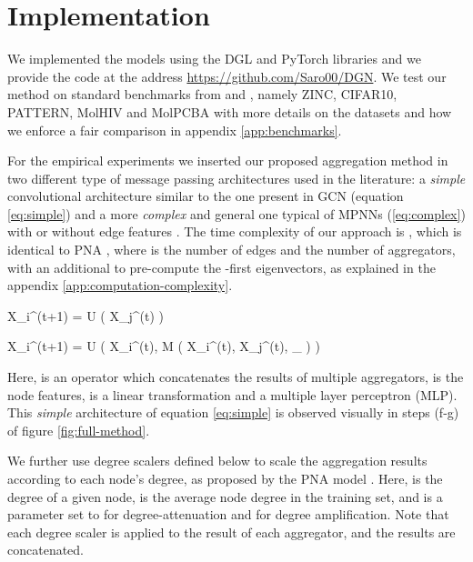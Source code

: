\documentclass{article} \usepackage{arxiv,times}
\begin{document}
\section{Implementation}
\label{sec:implementation}

We implemented the models using the DGL and PyTorch libraries and we provide the code at the address
\href{https://github.com/Saro00/DGN}{https://github.com/Saro00/DGN}. 
We test our method on standard benchmarks from \cite{dwivedi2020benchmarking} and \cite{hu2020open}, namely ZINC, CIFAR10, PATTERN, MolHIV and MolPCBA with more details on the datasets and how we enforce a fair comparison in appendix \ref{app:benchmarks}.

For the empirical experiments we inserted our proposed aggregation method in two different type of message passing architectures used in the literature: a \textit{simple} convolutional architecture similar to the one present in GCN (equation \ref{eq:simple}) \cite{kipf2016gcn} and a more \textit{complex} and general one typical of MPNNs (\ref{eq:complex}) \cite{gilmer2017mpnn} with or without edge features . The time complexity of our approach is , which is identical to PNA \cite{corso2020principal}, where  is the number of edges and  the number of aggregators, with an additional  to pre-compute the -first eigenvectors, as explained in the appendix \ref{app:computation-complexity}.

     \label{eq:simple}
    X_i^{(t+1)} = 
    U \Bigg(
    X_j^{(t)} \Bigg)
  
    \label{eq:complex}
    X_i^{(t+1)} = 
    U \Bigg( X_i^{(t)}, 
    M \Big( X_i^{(t)}, X_j^{(t)}, 
    _{}
    \Big) \Bigg)
  
Here,  is an operator which concatenates the results of multiple aggregators,  is the node features,  is a linear transformation and  a multiple layer perceptron (MLP). This \textit{simple} architecture of equation \ref{eq:simple} is observed visually in steps (f-g) of figure \ref{fig:full-method}.


We further use degree scalers  defined below to scale the aggregation results according to each node's degree, as proposed by the PNA model \cite{corso2020principal}. Here,  is the degree of a given node,  is the average node degree in the training set, and  is a parameter set to  for degree-attenuation and  for degree amplification. Note that each degree scaler is applied to the result of each aggregator, and the results are concatenated.
\end{document}
